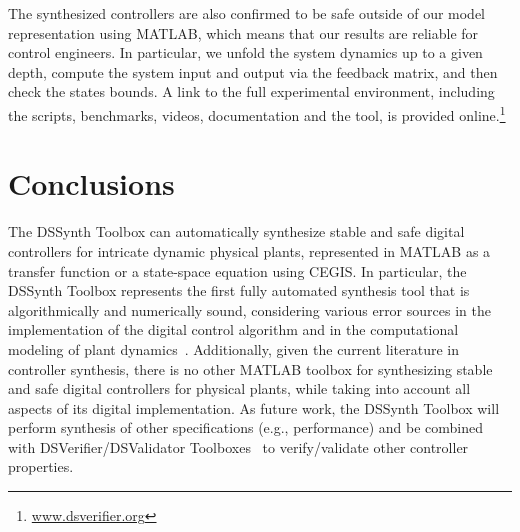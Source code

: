 \documentclass[10pt,conference]{IEEEtran}
\newcommand\tool{{DSSynth Toolbox}\xspace}
\begin{document}
The synthesized controllers are also confirmed to be safe outside of our model
representation using MATLAB, which means that our results are reliable for control engineers. 
In particular, we unfold the system dynamics up to a given depth, 
compute the system input and output via the feedback matrix, and then check the states bounds.
 A link to the full experimental environment, including the scripts, benchmarks, 
 videos, documentation and the tool, is provided online.\footnote{\url{www.dsverifier.org}}

\section{Conclusions}

The \tool can automatically synthesize stable and safe digital controllers
for intricate dynamic physical plants, represented in MATLAB as a transfer
function or a state-space equation using CEGIS.  In particular, the \tool
represents the first fully automated synthesis tool that is algorithmically
and numerically sound, considering various error sources in the
implementation of the digital control algorithm and in the computational
modeling of plant dynamics~\cite{abate2017,abatecav2017}.
%
Additionally, given the current literature in controller synthesis, there is
no other MATLAB toolbox for synthesizing stable and safe digital controllers
for physical plants, while taking into account all aspects of its digital
implementation.
%
As future work, the \tool will perform synthesis of other specifications
(e.g., performance) and be combined with DSVerifier/DSValidator
Toolboxes~\cite{issta2017,dsvalidator} to verify/validate other controller
properties.


 
\end{document}

